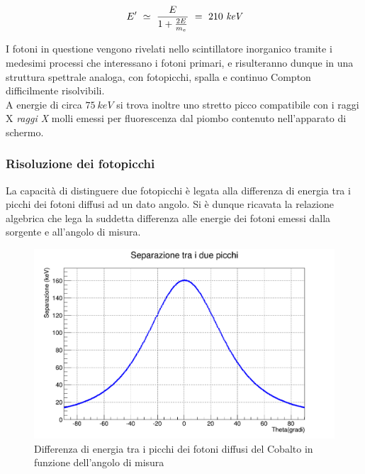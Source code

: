 \documentclass[11pt]{article}
\begin{document}
\begin{equation}
E'\ \simeq \ \frac{E}{1+\frac{2E}{m_e}} \ = \ 210\ \emph{keV}
\end{equation}

I fotoni in questione vengono rivelati nello scintillatore inorganico tramite i medesimi processi che interessano i fotoni primari, e risulteranno dunque in una struttura spettrale analoga, con fotopicchi, spalla e continuo Compton difficilmente risolvibili. \\

A energie di circa $75 \ keV$ si trova inoltre uno stretto picco compatibile con i raggi X \textit{raggi X} molli emessi per fluorescenza dal piombo contenuto nell'apparato di schermo. \cite{X_Ray}

\subsubsection{Risoluzione dei fotopicchi}
La capacità di distinguere due fotopicchi è legata alla differenza di energia tra i picchi dei fotoni diffusi ad un dato angolo. Si è dunque ricavata la relazione algebrica che lega la suddetta differenza alle energie dei fotoni emessi dalla sorgente e all'angolo di misura. 

\begin{figure}
\includegraphics[width=\textwidth]{"distanza_picchi"}
\caption{Differenza di energia tra i picchi dei fotoni diffusi del Cobalto in funzione dell'angolo di misura}
\label{fig:dist_picchi}
\end{figure}
\end{document}
